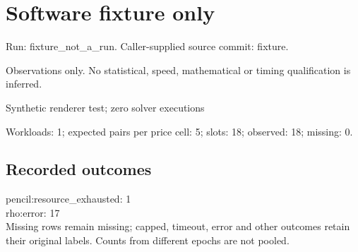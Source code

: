 \documentclass[10pt]{article}
\begin{document}
\raggedright\sloppy\section*{Software fixture only}
Run: fixture\_not\_a\_run. Caller-supplied source commit: fixture.\par
Observations only. No statistical, speed, mathematical or timing qualification is inferred.\par
Synthetic renderer test; zero solver executions\par Workloads: 1; expected pairs per price cell: 5; slots: 18; observed: 18; missing: 0.\par
\subsection*{Recorded outcomes}
pencil:resource\_exhausted: 1\\
rho:error: 17\\
 Missing rows remain missing; capped, timeout, error and other outcomes retain their original labels. Counts from different epochs are not pooled.\par
\end{document}
